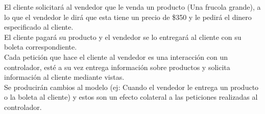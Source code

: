 \documentclass[a4paper,11pt]{report}
\begin{document}
El cliente solicitará al vendedor que le venda un producto (Una frucola grande),
a lo que el vendedor le dirá que esta tiene un precio de \$350 y le pedirá el dinero especificado al cliente.\\
El cliente pagará su producto y el vendedor se lo entregará al cliente con su boleta correspondiente.\\
Cada petición que hace el cliente al vendedor es una interacción con
un controlador, esté a su vez entrega información sobre productos y solicita información al cliente mediante vistas.\\
Se producirán cambios al modelo (ej: Cuando el vendedor le entrega
un producto o la boleta al cliente) y estos son un efecto colateral a las peticiones realizadas al controlador.
\end{document}
